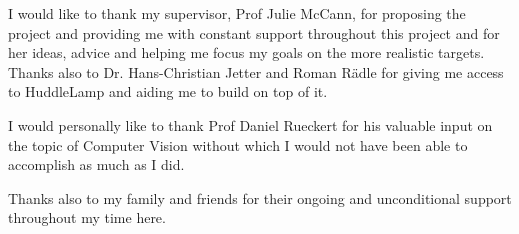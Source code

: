 
\cleardoublepage


\begin{acknowledgements}

I would like to thank my supervisor, Prof Julie McCann, for proposing the project and
providing me with constant support throughout this project and for her ideas, advice and helping me focus my goals on the more realistic targets.
Thanks also to Dr. Hans-Christian Jetter  and Roman Rädle for giving me access to HuddleLamp and aiding me to build on top of it. 

I would personally like to thank Prof Daniel Rueckert for his valuable input on the topic of Computer Vision without which I would not have been able to accomplish as much as I did.

Thanks also to my family and friends for their ongoing and unconditional support throughout my time here.

\end{acknowledgements}
